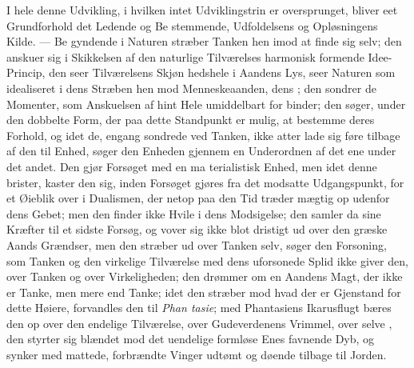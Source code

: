 I hele denne Udvikling, i hvilken intet Udviklingstrin er
oversprunget, bliver eet Grundforhold det Ledende og Be\-%
stemmende, Udfoldelsens og Opløsningens Kilde. --- Be\-%
gyndende i Naturen stræber Tanken hen imod at finde sig
selv; den anskuer sig i Skikkelsen af den naturlige Tilværelses
harmonisk formende Idee-Princip, den seer Tilværelsens Skjøn\-%
hedshele i Aandens Lys, seer Naturen som idealiseret i dens
Stræben hen mod Menneskeaanden, dens ; den sondrer
de Momenter, som Anskuelsen af hint Hele umiddelbart for\-%
binder; den søger, under den dobbelte Form, der paa dette
Standpunkt er mulig, at bestemme deres Forhold, og idet de,
engang sondrede ved Tanken, ikke atter lade sig føre tilbage
af den til Enhed, søger den Enheden gjennem en Underordnen
af det ene under det andet. Den gjør Forsøget med en ma\-%
terialistisk Enhed, men idet denne brister, kaster den sig,
inden Forsøget gjøres fra det modsatte Udgangspunkt, for et
Øieblik over i Dualismen, der netop paa den Tid træder
mægtig op udenfor dens Gebet; men den finder ikke Hvile i
dens Modsigelse; den samler da sine Kræfter til et sidste
Forsøg, og vover sig ikke blot dristigt ud over den græske
Aands Grændser, men den stræber ud over Tanken selv, søger
den Forsoning, som Tanken og den virkelige Tilværelse med
dens uforsonede Splid ikke giver den, over Tanken og over
Virkeligheden; den drømmer om en Aandens Magt, der ikke
er Tanke, men mere end Tanke; idet den stræber mod hvad
der er Gjenstand for dette Høiere, forvandles den til \emph{Phan\-%
tasie}; med Phantasiens Ikarusflugt bæres den op over den
endelige Tilværelse, over Gudeverdenens Vrimmel, over selve
, den styrter sig blændet mod det uendelige formløse
Enes favnende Dyb, og synker med mattede, forbrændte Vinger
udtømt og døende tilbage til Jorden.

\divrule

